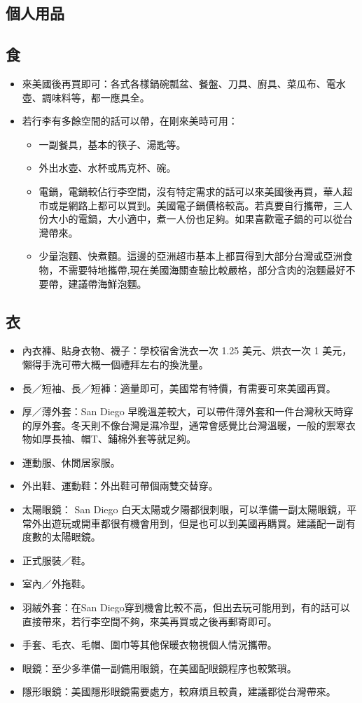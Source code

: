 \documentclass[10pt,a4paper]{book}
\begin{document}
\begin{CJK}{UTF8}{bkai}
\section{個人用品}
\subsection{食}
\begin{itemize}
\item 來美國後再買即可：各式各樣鍋碗瓢盆、餐盤、刀具、廚具、菜瓜布、電水壺、調味料等，都一應具全。
\item 若行李有多餘空間的話可以帶，在剛來美時可用：
\begin{itemize}
\item 一副餐具，基本的筷子、湯匙等。
\item 外出水壺、水杯或馬克杯、碗。
\item 電鍋，電鍋較佔行李空間，沒有特定需求的話可以來美國後再買，華人超市或是網路上都可以買到。美國電子鍋價格較高。若真要自行攜帶，三人份大小的電鍋，大小適中，煮一人份也足夠。如果喜歡電子鍋的可以從台灣帶來。
\item 少量泡麵、快煮麵。這邊的亞洲超市基本上都買得到大部分台灣或亞洲食物，不需要特地攜帶,現在美國海關查驗比較嚴格，部分含肉的泡麵最好不要帶，建議帶海鮮泡麵。
\end{itemize}
\end{itemize}

\subsection{衣}
\begin{itemize}
\item 內衣褲、貼身衣物、襪子：學校宿舍洗衣一次 1.25 美元、烘衣一次 1 美元，懶得手洗可帶大概一個禮拜左右的換洗量。
\item 長／短袖、長／短褲：適量即可，美國常有特價，有需要可來美國再買。
\item 厚／薄外套：San Diego 早晚溫差較大，可以帶件薄外套和一件台灣秋天時穿的厚外套。冬天則不像台灣是濕冷型，通常會感覺比台灣溫暖，一般的禦寒衣物如厚長袖、帽T、鋪棉外套等就足夠。
\item 運動服、休閒居家服。
\item 外出鞋、運動鞋：外出鞋可帶個兩雙交替穿。
\item 太陽眼鏡： San Diego 白天太陽或夕陽都很刺眼，可以準備一副太陽眼鏡，平常外出遊玩或開車都很有機會用到，但是也可以到美國再購買。建議配一副有度數的太陽眼鏡。
\item 正式服裝／鞋。
\item 室內／外拖鞋。
\item 羽絨外套：在San Diego穿到機會比較不高，但出去玩可能用到，有的話可以直接帶來，若行李空間不夠，來美再買或之後再郵寄即可。
\item 手套、毛衣、毛帽、圍巾等其他保暖衣物視個人情況攜帶。
\item 眼鏡：至少多準備一副備用眼鏡，在美國配眼鏡程序也較繁瑣。
\item 隱形眼鏡：美國隱形眼鏡需要處方，較麻煩且較貴，建議都從台灣帶來。
\end{itemize}


\end{CJK}
\end{document}
